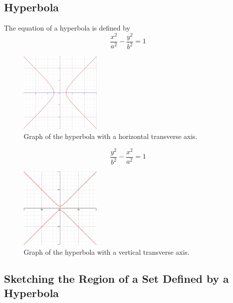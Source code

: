 \documentclass{article}
\begin{document}
\subsection*{Hyperbola}

\begin{definitionbox}
The equation of a hyperbola is defined by
\[
    \dfrac{x^2}{a^2} - \dfrac{y^2}{b^2} = 1
\]

\begin{figure}[H]
    \centering
    \includegraphics[width=0.35\textwidth]{hyperbola horizontal transverse axis.png}
    \caption{Graph of the hyperbola with a horizontal transverse axis.}
    \label{fig:horizontal_hyperbola}
\end{figure}

\[
    \dfrac{y^2}{b^2} - \dfrac{x^2}{a^2} = 1
\]

\begin{figure}[H]
    \centering
    \includegraphics[width=0.35\textwidth]{hyperbola vertical transverse axis.png}
    \caption{Graph of the hyperbola with a vertical transverse axis.}
    \label{fig:vertical_hyperbola}
\end{figure}

\end{definitionbox}

\subsection*{Sketching the Region of a Set Defined by a Hyperbola}
\end{document}
